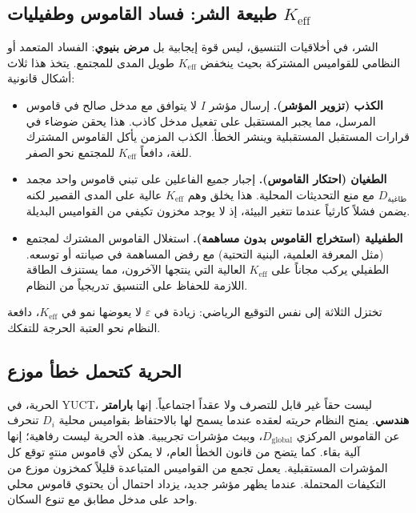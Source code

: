 \documentclass[12pt,a4paper]{article}
\begin{document}
	\subsection{طبيعة الشر: فساد القاموس وطفيليات \(K_{\mathrm{eff}}\)}
	
	الشر، في أخلاقيات التنسيق، ليس قوة إيجابية بل \textbf{مرض بنيوي}: الفساد المتعمد أو النظامي للقواميس المشتركة بحيث ينخفض \(K_{\mathrm{eff}}\) طويل المدى للمجتمع. يتخذ هذا ثلاث أشكال قانونية:
	
	\begin{itemize}[leftmargin=*]
		\item \textbf{الكذب (تزوير المؤشر).} إرسال مؤشر \(I\) لا يتوافق مع مدخل صالح في قاموس المرسل، مما يجبر المستقبل على تفعيل مدخل كاذب. هذا يحقن ضوضاء في قرارات المستقبل المستقبلية وينشر الخطأ. الكذب المزمن يأكل القاموس المشترك للغة، دافعاً \(K_{\mathrm{eff}}\) للمجتمع نحو الصفر.
		\item \textbf{الطغيان (احتكار القاموس).} إجبار جميع الفاعلين على تبني قاموس واحد مجمد \(D_{\text{طاغية}}\) مع منع التحديثات المحلية. هذا يخلق وهم \(K_{\mathrm{eff}}\) عالية على المدى القصير لكنه يضمن فشلاً كارثياً عندما تتغير البيئة، إذ لا يوجد مخزون تكيفي من القواميس البديلة.
		\item \textbf{الطفيلية (استخراج القاموس بدون مساهمة).} استغلال القاموس المشترك لمجتمع (مثل المعرفة العلمية، البنية التحتية) مع رفض المساهمة في صيانته أو توسعه. الطفيلي يركب مجاناً على \(K_{\mathrm{eff}}\) العالية التي ينتجها الآخرون، مما يستنزف الطاقة اللازمة للحفاظ على التنسيق تدريجياً من النظام.
	\end{itemize}
	
	تختزل الثلاثة إلى نفس التوقيع الرياضي: زيادة في \(\varepsilon\) لا يعوضها نمو في \(K_{\mathrm{eff}}\)، دافعة النظام نحو العتبة الحرجة للتفكك.
	
	\subsection{الحرية كتحمل خطأ موزع}
	
	الحرية، في YUCT، ليست حقاً غير قابل للتصرف ولا عقداً اجتماعياً. إنها \textbf{بارامتر هندسي}. يمنح النظام حريته لعقده عندما يسمح لها بالاحتفاظ بقواميس محلية \(D_i\) تنحرف عن القاموس المركزي \(D_{\text{global}}\)، وببث مؤشرات تجريبية. هذه الحرية ليست رفاهية؛ إنها آلية بقاء. كما يتضح من قانون الخطأ العام، لا يمكن لأي قاموس منتهٍ توقع كل المؤشرات المستقبلية. يعمل تجمع من القواميس المتباعدة قليلاً كمخزون موزع من التكيفات المحتملة. عندما يظهر مؤشر جديد، يزداد احتمال أن يحتوي قاموس محلي واحد على مدخل مطابق مع تنوع السكان.
	
\end{document}
